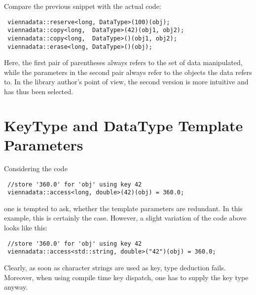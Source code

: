 Compare the previous snippet with the actual code:
\begin{lstlisting}
 viennadata::reserve<long, DataType>(100)(obj);
 viennadata::copy<long,  DataType>(42)(obj1, obj2);
 viennadata::copy<long,  DataType>()(obj1, obj2);
 viennadata::erase<long, DataType>()(obj);
\end{lstlisting}
Here, the first pair of parentheses always refers to the set of data manipulated, while the parameters in the second pair always refer to the objects the data refers to.
In the library author's point of view, the second version is more intuitive and has thus been selected.


\section{KeyType and DataType Template Parameters}
Considering the code
\begin{lstlisting}
 //store '360.0' for 'obj' using key 42
 viennadata::access<long, double>(42)(obj) = 360.0;
\end{lstlisting}
one is tempted to ask, whether the template parameters are redundant.
In this example, this is certainly the case. However, a slight variation of the code above looks like this:
\begin{lstlisting}
 //store '360.0' for 'obj' using key 42
 viennadata::access<std::string, double>("42")(obj) = 360.0;
\end{lstlisting}
Clearly, as soon as character strings are used as key, type deduction fails. Moreover, when using compile time key dispatch, one has to supply the
key type anyway.

